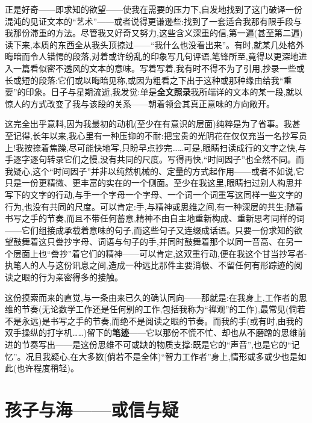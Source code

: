 正是好奇——即求知的欲望——使我在需要的压力下,自发地找到了这门破译一份混沌的见证文本的“艺术”——或者说得更谦逊些:找到了一套适合我那有限手段与我那份滞重的方法。尽管我又好奇又努力,这些含义深重的信,第一遍(甚至第二遍)读下来,本质的东西全从我头顶掠过——“我什么也没看出来”。有时,就某几处格外晦暗而令人错愕的段落,对着或许纷乱的印象写几句评语,笔锋所至,竟得以更深地进入一篇看似密不透风的文本的意味。写着写着,我有时不得不为了引用,抄录一些或长或短的段落:它们或以晦暗见称,或因为粗看之下出于这种或那种缘由给我“重要”的印象。日子与星期流逝,我发觉:单是\textbf{全文照录}我所端详的文本的某一段,就以惊人的方式改变了我与该段的关系——朝着领会其真正意味的方向敞开。

这完全出乎意料,因为我最初的动机(至少在有意识的层面)纯粹是为了省事。我甚至记得,长年以来,我心里有一种压抑的不耐:把宝贵的光阴花在仅仅充当一名抄写员上!我按捺着焦躁,尽可能快地写,只盼早点抄完……可是,眼睛扫读成行的文字之快,与手逐字逐句转录它们之慢,没有共同的尺度。写得再快,“时间因子”也全然不同。而我疑心,这个“时间因子”并非以纯然机械的、定量的方式起作用——或者不如说,它只是一份更精微、更丰富的实在的一个侧面。至少在我这里,眼睛扫过别人构思并写下的文字的行动,与手一个字母一个字母、一个词一个词重写这同样一些文字的行为,也没有共同的尺度。可以肯定:手,与精神或思维之间,有一种深层的共生;随着书写之手的节奏,而且不带任何蓄意,精神不由自主地重新构成、重新思考同样的词——它们组接成承载着意味的句子,而这些句子又连缀成话语。只要一份求知的欲望鼓舞着这只誊抄字母、词语与句子的手,并同时鼓舞着那个以同一音高、在另一个层面上也“誊抄”着它们的精神——可以肯定,这双重行动,便在我这个甘当抄写者-执笔人的人与这份讯息之间,造成一种远比那件主要消极、不留任何有形踪迹的阅读之眼的行为亲密得多的接触。

这份摸索而来的直觉,与一条由来已久的确认同向——那就是:在我身上,工作者的思维的节奏(无论数学工作还是任何别的工作,包括我称为“禅观”的工作),最常见(倘若不是永远)是书写之手的节奏,而绝不是阅读之眼的节奏。而我的手(或有时,由我的双手操纵的打字机……)\dmark{}留下的\textbf{笔迹}——它以那份不慌不忙、却也从不磨蹭的思维前进的节奏写出——是这份思维不可或缺的物质支撑:既是它的“声音”,也是它的“记忆”。况且我疑心,在大多数(倘若不是全体)“智力工作者”身上,情形或多或少也是如此(也许程度稍轻)。

\section{孩子与海——或信与疑}

